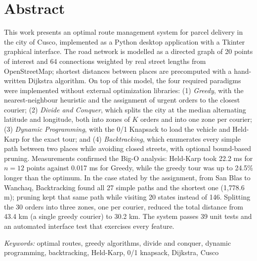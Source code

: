\chapter*{Abstract}

This work presents an optimal route management system for parcel delivery in the city of Cusco, implemented as a Python desktop application with a Tkinter graphical interface. The road network is modelled as a directed graph of 20 points of interest and 64 connections weighted by real street lengths from OpenStreetMap; shortest distances between places are precomputed with a hand-written Dijkstra algorithm. On top of this model, the four required paradigms were implemented without external optimization libraries: (1) \textit{Greedy}, with the nearest-neighbour heuristic and the assignment of urgent orders to the closest courier; (2) \textit{Divide and Conquer}, which splits the city at the median alternating latitude and longitude, both into zones of $K$ orders and into one zone per courier; (3) \textit{Dynamic Programming}, with the 0/1 Knapsack to load the vehicle and Held-Karp for the exact tour; and (4) \textit{Backtracking}, which enumerates every simple path between two places while avoiding closed streets, with optional bound-based pruning. Measurements confirmed the Big-O analysis: Held-Karp took 22.2 ms for $n=12$ points against 0.017 ms for Greedy, while the greedy tour was up to 24.5\% longer than the optimum. In the case stated by the assignment, from San Blas to Wanchaq, Backtracking found all 27 simple paths and the shortest one (1,778.6 m); pruning kept that same path while visiting 20 states instead of 146. Splitting the 30 orders into three zones, one per courier, reduced the total distance from 43.4 km (a single greedy courier) to 30.2 km. The system passes 39 unit tests and an automated interface test that exercises every feature.

\textit{Keywords:} optimal routes, greedy algorithms, divide and conquer, dynamic programming, backtracking, Held-Karp, 0/1 knapsack, Dijkstra, Cusco
